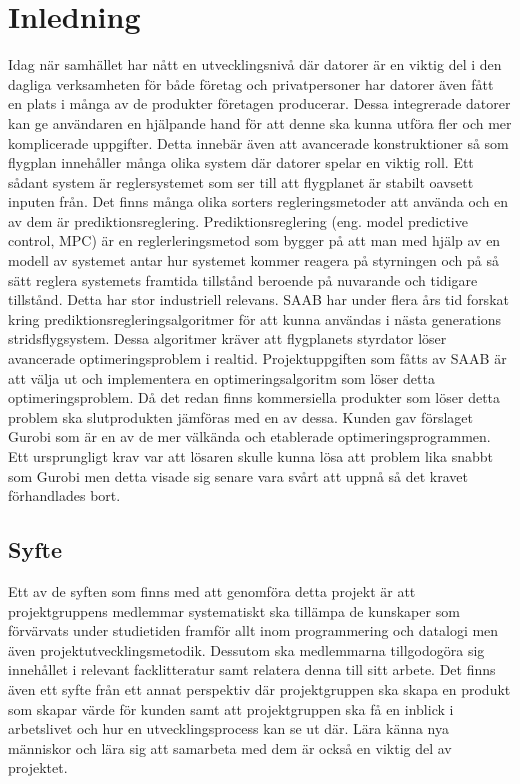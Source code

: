 \section{Inledning}
Idag när samhället har nått en utvecklingsnivå där datorer är en viktig del i den dagliga verksamheten för både företag och privatpersoner har datorer även fått en plats i många av de produkter företagen producerar. Dessa integrerade datorer kan ge användaren en hjälpande hand för att denne ska kunna utföra fler och mer komplicerade uppgifter. Detta innebär även att avancerade konstruktioner så som flygplan innehåller många olika system där datorer spelar en viktig roll. Ett sådant system är reglersystemet som ser till att flygplanet är stabilt oavsett inputen från. Det finns många olika sorters regleringsmetoder att använda och en av dem är prediktionsreglering. 
\newline
\newline
Prediktionsreglering (eng. model predictive control, MPC) är en reglerleringsmetod som 
bygger på att man med hjälp av en modell av systemet antar hur systemet kommer reagera på styrningen och på så sätt reglera systemets framtida tillstånd beroende på nuvarande och tidigare tillstånd. Detta har stor industriell relevans.\citep[2]{ir}
\newline
\newline
SAAB har under flera års tid forskat kring prediktionsregleringsalgoritmer för att kunna användas i nästa generations stridsflygsystem. Dessa algoritmer kräver att flygplanets styrdator löser avancerade optimeringsproblem i realtid.
\newline
\newline
Projektuppgiften som fåtts av SAAB är att välja ut och implementera en optimeringsalgoritm som löser detta optimeringsproblem. Då det redan finns kommersiella produkter som löser detta problem ska slutprodukten jämföras med en av dessa. Kunden gav förslaget Gurobi som är en av de mer välkända och etablerade optimeringsprogrammen. Ett ursprungligt krav var att lösaren skulle kunna lösa att problem lika snabbt som Gurobi men detta visade sig senare vara svårt att uppnå så det kravet förhandlades bort. 

\subsection{Syfte}
Ett av de syften som finns med att genomföra detta projekt är att projektgruppens medlemmar systematiskt ska tillämpa de kunskaper som förvärvats under studietiden framför allt inom programmering och datalogi men även projektutvecklingsmetodik. Dessutom ska medlemmarna tillgodogöra sig innehållet i relevant facklitteratur samt relatera denna till sitt arbete. 
Det finns även ett syfte från ett annat perspektiv där projektgruppen ska skapa en produkt som skapar värde för kunden samt att projektgruppen ska få en inblick i arbetslivet och hur en utvecklingsprocess kan se ut där. Lära känna nya människor och lära sig att samarbeta med dem är också en viktig del av projektet. 

